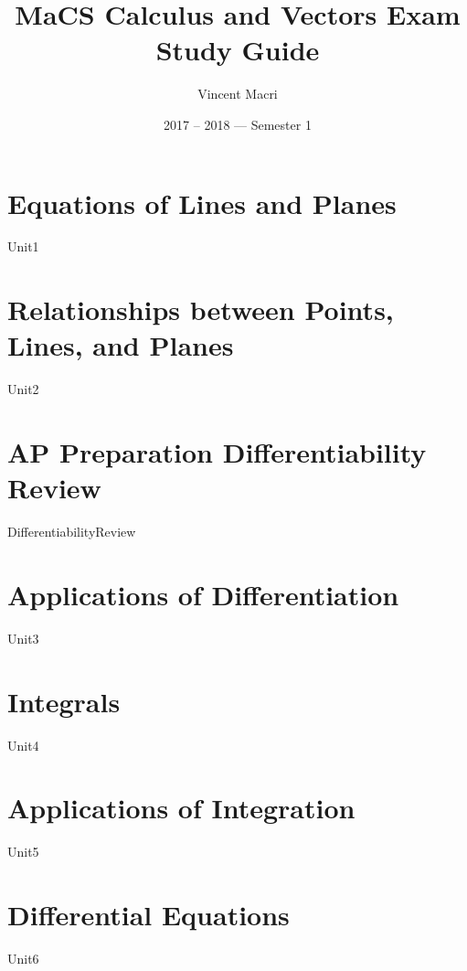 \documentclass[letterpaper,12pt]{report}
\title{MaCS Calculus and Vectors Exam Study Guide}
\author{Vincent Macri}
\date{2017 -- 2018 --- Semester 1}
\begin{document}
	\maketitle
	\clearpage
	\tableofcontents
	\clearpage

	\part{Equations of Lines and Planes}
		{Unit1}
	\part{Relationships between Points, Lines, and Planes}
		{Unit2}
	\part*{AP Preparation Differentiability Review}
		{DifferentiabilityReview}
	\part{Applications of Differentiation}
		{Unit3}
	\part{Integrals}
		{Unit4}
	\part{Applications of Integration}
		{Unit5}
	\part{Differential Equations}
		{Unit6}
	
\end{document}
